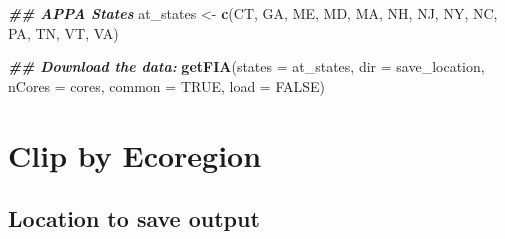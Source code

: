 \documentclass[
]{book}
\newenvironment{Shaded}{\begin{snugshade}}{\end{snugshade}}
\newcommand{\AttributeTok}[1]{\textcolor[rgb]{0.13,0.29,0.53}{#1}}
\newcommand{\ConstantTok}[1]{\textcolor[rgb]{0.56,0.35,0.01}{#1}}
\newcommand{\DocumentationTok}[1]{\textcolor[rgb]{0.56,0.35,0.01}{\textbf{\textit{#1}}}}
\newcommand{\FunctionTok}[1]{\textcolor[rgb]{0.13,0.29,0.53}{\textbf{#1}}}
\newcommand{\NormalTok}[1]{#1}
\newcommand{\OtherTok}[1]{\textcolor[rgb]{0.56,0.35,0.01}{#1}}
\newcommand{\StringTok}[1]{\textcolor[rgb]{0.31,0.60,0.02}{#1}}
\begin{document}
\begin{Shaded}
\begin{Highlighting}[]
\DocumentationTok{\#\# APPA States}
\NormalTok{at\_states }\OtherTok{\textless{}{-}} \FunctionTok{c}\NormalTok{(}\StringTok{\textquotesingle{}CT\textquotesingle{}}\NormalTok{, }\StringTok{\textquotesingle{}GA\textquotesingle{}}\NormalTok{, }\StringTok{\textquotesingle{}ME\textquotesingle{}}\NormalTok{, }\StringTok{\textquotesingle{}MD\textquotesingle{}}\NormalTok{, }\StringTok{\textquotesingle{}MA\textquotesingle{}}\NormalTok{, }
               \StringTok{\textquotesingle{}NH\textquotesingle{}}\NormalTok{, }\StringTok{\textquotesingle{}NJ\textquotesingle{}}\NormalTok{, }\StringTok{\textquotesingle{}NY\textquotesingle{}}\NormalTok{, }\StringTok{\textquotesingle{}NC\textquotesingle{}}\NormalTok{, }\StringTok{\textquotesingle{}PA\textquotesingle{}}\NormalTok{, }
               \StringTok{\textquotesingle{}TN\textquotesingle{}}\NormalTok{, }\StringTok{\textquotesingle{}VT\textquotesingle{}}\NormalTok{, }\StringTok{\textquotesingle{}VA\textquotesingle{}}\NormalTok{)}

\DocumentationTok{\#\# Download the data:}
\FunctionTok{getFIA}\NormalTok{(}\AttributeTok{states =}\NormalTok{ at\_states, }\AttributeTok{dir =}\NormalTok{ save\_location, }
       \AttributeTok{nCores =}\NormalTok{ cores, }\AttributeTok{common =} \ConstantTok{TRUE}\NormalTok{, }\AttributeTok{load =} \ConstantTok{FALSE}\NormalTok{) }
\end{Highlighting}
\end{Shaded}

\hypertarget{clip}{%
\chapter{Clip by Ecoregion}\label{clip}}

\hypertarget{location-to-save-output}{%
\section{Location to save output}\label{location-to-save-output}}
\end{document}
